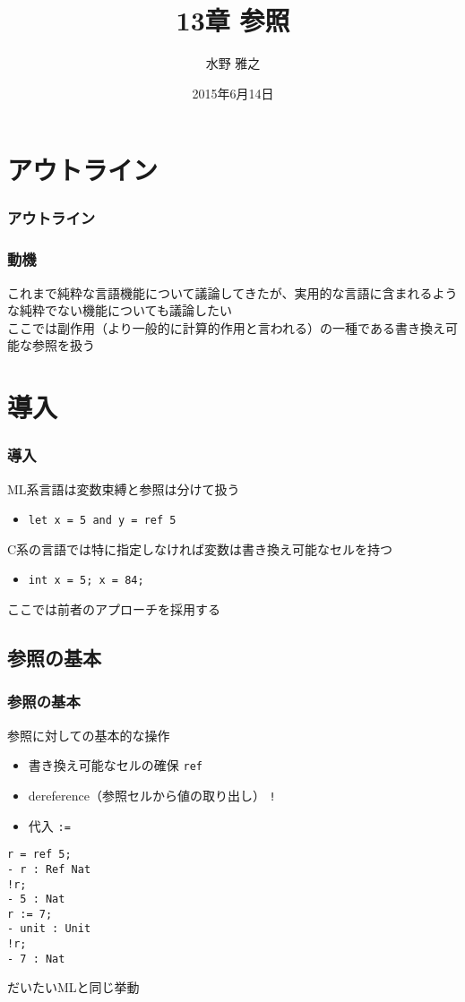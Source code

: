 \documentclass[dvipdfmx,cjk,xcolor=dvipsnames,envcountsect,notheorems]{beamer}
\title{13章 参照}
\author{水野 雅之}
\date{2015年6月14日}
\theoremstyle{definition}
\begin{document}
\frame[plain]{\titlepage}

\section*{アウトライン}

\begin{frame}
	\frametitle{アウトライン}
	\tableofcontents[sectionstyle=show,subsectionstyle=hide]
\end{frame}

\begin{frame}
	\frametitle{動機}
	\Large これまで純粋な言語機能について議論してきたが、実用的な言語に含まれるような純粋でない機能についても議論したい\\
	\vfill
	ここでは副作用（より一般的に計算的作用と言われる）の一種である書き換え可能な参照を扱う
\end{frame}

\section{導入}

\begin{frame}
	\frametitle{導入}
	\Large ML系言語は変数束縛と参照は分けて扱う
	\begin{itemize}
		\item \lstinline|let x = 5 and y = ref 5|
	\end{itemize}
	C系の言語では{\small 特に指定しなければ}変数は書き換え可能なセルを持つ
	\begin{itemize}
		\item \lstinline|int x = 5; x = 84;|
	\end{itemize}
	\vfill
	ここでは前者のアプローチを採用する
\end{frame}

\subsection{参照の基本}

\begin{frame}[fragile]
	\frametitle{参照の基本}
	\Large 参照に対しての基本的な操作
	\begin{itemize}
		\item 書き換え可能なセルの確保 \lstinline|ref|
		\item dereference（参照セルから値の取り出し） \lstinline|!|
		\item 代入 \lstinline|:=|
	\end{itemize}
\begin{lstlisting}
r = ref 5;
- r : Ref Nat
!r;
- 5 : Nat
r := 7;
- unit : Unit
!r;
- 7 : Nat
\end{lstlisting}
	だいたいMLと同じ挙動
\end{frame}
\end{document}
